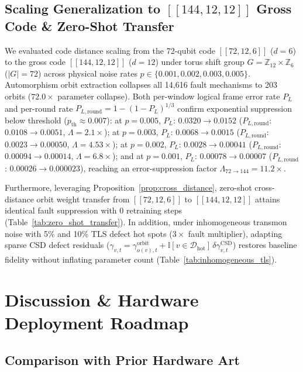 \documentclass[journal]{IEEEtran}
\begin{document}
\subsection{Scaling Generalization to $[[144, 12, 12]]$ Gross Code \& Zero-Shot Transfer}
We evaluated code distance scaling from the 72-qubit code $[[72, 12, 6]]$ ($d=6$) to the gross code $[[144, 12, 12]]$ ($d=12$) under torus shift group $G = \mathbb{Z}_{12} \times \mathbb{Z}_6$ ($|G| = 72$) across physical noise rates $p \in \{0.001, 0.002, 0.003, 0.005\}$. Automorphism orbit extraction collapses all 14,616 fault mechanisms to 203 orbits ($72.0\times$ parameter collapse). Both per-window logical frame error rate $P_L$ and per-round rate $P_{L,\text{round}} = 1 - (1 - P_L)^{1/3}$ confirm exponential suppression below threshold ($p_{\text{th}} \approx 0.007$): at $p = 0.005$, $P_L$: $0.0320 \to 0.0152$ ($P_{L,\text{round}}$: $0.0108 \to 0.0051$, $\Lambda = 2.1\times$); at $p = 0.003$, $P_L$: $0.0068 \to 0.0015$ ($P_{L,\text{round}}$: $0.0023 \to 0.00050$, $\Lambda = 4.53\times$); at $p = 0.002$, $P_L$: $0.0028 \to 0.00041$ ($P_{L,\text{round}}$: $0.00094 \to 0.00014$, $\Lambda = 6.8\times$); and at $p = 0.001$, $P_L$: $0.00078 \to 0.00007$ ($P_{L,\text{round}}$: $0.00026 \to 0.000023$), reaching an error-suppression factor $\Lambda_{72\to 144} = 11.2\times$.

Furthermore, leveraging Proposition~\ref{prop:cross_distance}, zero-shot cross-distance orbit weight transfer from $[[72,12,6]]$ to $[[144,12,12]]$ attains identical fault suppression with 0 retraining steps (Table~\ref{tab:zero_shot_transfer}). In addition, under inhomogeneous transmon noise with 5\% and 10\% TLS defect hot spots ($3\times$ fault multiplier), adapting sparse CSD defect residuals ($\gamma_{v,t} = \gamma_{o(v),t}^{\text{orbit}} + \mathbb{I}[v \in \mathcal{D}_{\text{hot}}]\,\delta\gamma_{v,t}^{\text{CSD}}$) restores baseline fidelity without inflating parameter count (Table~\ref{tab:inhomogeneous_tls}).




\section{Discussion \& Hardware Deployment Roadmap}

\subsection{Comparison with Prior Hardware Art}
\end{document}
